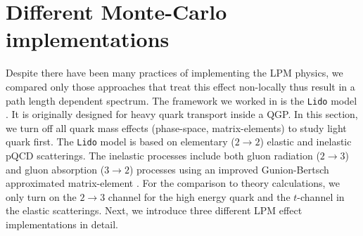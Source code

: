 \documentclass[aps, prc, reprint, amsmath, groupedaddress, nofootinbib]{revtex4-1}
\begin{document}
\section{Different Monte-Carlo implementations}\label{section:MC}
Despite there have been many practices of implementing the LPM physics,
we compared only those approaches that treat this effect non-locally thus result in a path length dependent spectrum.
The framework we worked in is the {\tt Lido} model \cite{Ke:2018tsh}. 
It is originally designed for heavy quark transport inside a QGP. 
In this section, we turn off all quark mass effects (phase-space, matrix-elements) to study light quark first.
The {\tt Lido} model is based on elementary ($2\rightarrow2$) elastic and inelastic pQCD scatterings. 
The inelastic processes include both gluon radiation ($2\rightarrow 3$) and gluon absorption ($3\rightarrow 2$) processes using an improved Gunion-Bertsch approximated matrix-element \cite{Fochler:2013epa,Uphoff:2014hza}.
For the comparison to theory calculations, we only turn on the $2\rightarrow 3$ channel for the high energy quark and the $t$-channel in the elastic scatterings.
Next, we introduce three different LPM effect implementations in detail.
\end{document}
